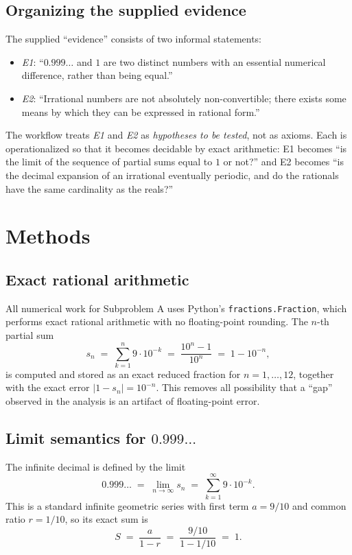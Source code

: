\documentclass[11pt,a4paper]{article}
\begin{document}
\subsection{Organizing the supplied evidence}
The supplied ``evidence'' consists of two informal statements:
\begin{itemize}
  \item \emph{E1}: ``$0.999\ldots$ and $1$ are two distinct numbers with an
        essential numerical difference, rather than being equal.''
  \item \emph{E2}: ``Irrational numbers are not absolutely non-convertible;
        there exists some means by which they can be expressed in rational
        form.''
\end{itemize}
The workflow treats \emph{E1} and \emph{E2} as \emph{hypotheses to be tested},
not as axioms. Each is operationalized so that it becomes decidable by exact
arithmetic: E1 becomes ``is the limit of the sequence of partial sums equal to
$1$ or not?'' and E2 becomes ``is the decimal expansion of an irrational
eventually periodic, and do the rationals have the same cardinality as the
reals?''

\section{Methods}
\label{sec:method}

\subsection{Exact rational arithmetic}
All numerical work for Subproblem A uses Python's \texttt{fractions.Fraction},
which performs exact rational arithmetic with no floating-point rounding. The
$n$-th partial sum
\begin{equation}
  s_n \;=\; \sum_{k=1}^{n} 9\cdot 10^{-k}
      \;=\; \frac{10^{n}-1}{10^{n}}
      \;=\; 1 - 10^{-n},
\end{equation}
is computed and stored as an exact reduced fraction for $n=1,\dots,12$, together
with the exact error $|1-s_n|=10^{-n}$. This removes all possibility that a
``gap'' observed in the analysis is an artifact of floating-point error.

\subsection{Limit semantics for $0.999\ldots$}
The infinite decimal is defined by the limit
\begin{equation}
  0.999\ldots \;=\; \lim_{n\to\infty} s_n
        \;=\; \sum_{k=1}^{\infty} 9\cdot 10^{-k}.
\end{equation}
This is a standard infinite geometric series with first term $a=9/10$ and common
ratio $r=1/10$, so its exact sum is
\begin{equation}
  S \;=\; \frac{a}{1-r} \;=\; \frac{9/10}{1-1/10} \;=\; 1.
\end{equation}
\end{document}

